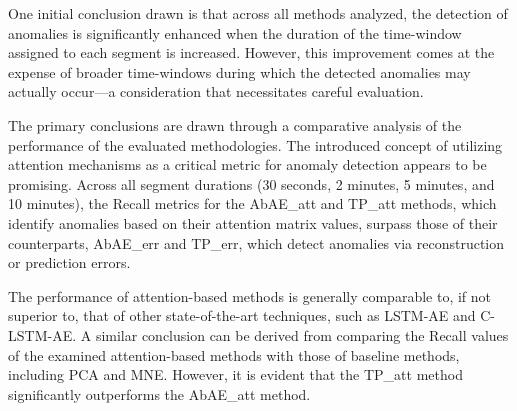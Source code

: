 \documentclass[conference]{IEEEtran}
\begin{document}
One initial conclusion drawn is that across all methods analyzed, the detection of anomalies is significantly enhanced when the duration of the time-window assigned to each segment is increased. However, this improvement comes at the expense of broader time-windows during which the detected anomalies may actually occur---a consideration that necessitates careful evaluation. 

The primary conclusions are drawn through a comparative analysis of the performance of the evaluated methodologies. The introduced concept of utilizing attention mechanisms as a critical metric for anomaly detection appears to be promising. Across all segment durations (30 seconds, 2 minutes, 5 minutes, and 10 minutes), the Recall metrics for the AbAE\_att and TP\_att methods, which identify anomalies based on their attention matrix values, surpass those of their counterparts, AbAE\_err and TP\_err, which detect anomalies via reconstruction or prediction errors.

The performance of attention-based methods is generally comparable to, if not superior to, that of other state-of-the-art techniques, such as LSTM-AE and C-LSTM-AE. A similar conclusion can be derived from comparing the Recall values of the examined attention-based methods with those of baseline methods, including PCA and MNE. However, it is evident that the TP\_att method significantly outperforms the AbAE\_att method.
\end{document}
